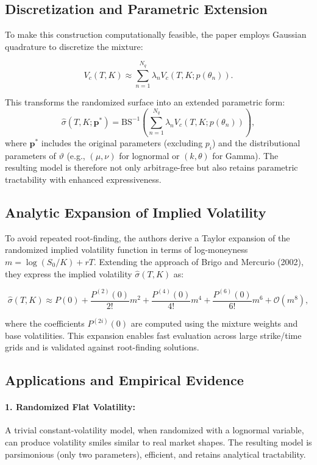 \subsection{Discretization and Parametric Extension}

To make this construction computationally feasible, the paper employs Gaussian quadrature to discretize the mixture:

\[
    V_c(T,K) \approx \sum_{n=1}^{N_q} \lambda_n V_c(T,K; p(\theta_n)).
\]

This transforms the randomized surface into an extended parametric form:
\[
    \hat{\sigma}(T,K; \mathbf{p}^*) = \text{BS}^{-1}\left(\sum_{n=1}^{N_q} \lambda_n V_c(T,K; p(\theta_n))\right),
\]
where $\mathbf{p}^*$ includes the original parameters (excluding $p_i$) and the distributional parameters of $\vartheta$ (e.g., $(\mu, \nu)$ for lognormal or $(k, \theta)$ for Gamma). The resulting model is therefore not only arbitrage-free but also retains parametric tractability with enhanced expressiveness.

\subsection{Analytic Expansion of Implied Volatility}

To avoid repeated root-finding, the authors derive a Taylor expansion of the randomized implied volatility function in terms of log-moneyness $m = \log(S_0/K) + rT$. Extending the approach of Brigo and Mercurio (2002), they express the implied volatility $\hat{\sigma}(T,K)$ as:

\[
    \hat{\sigma}(T,K) \approx P(0) + \frac{P^{(2)}(0)}{2!}m^2 + \frac{P^{(4)}(0)}{4!}m^4 + \frac{P^{(6)}(0)}{6!}m^6 + \mathcal{O}(m^8),
\]

where the coefficients $P^{(2i)}(0)$ are computed using the mixture weights and base volatilities. This expansion enables fast evaluation across large strike/time grids and is validated against root-finding solutions.

\subsection{Applications and Empirical Evidence}

\paragraph{1. Randomized Flat Volatility:}
A trivial constant-volatility model, when randomized with a lognormal variable, can produce volatility smiles similar to real market shapes. The resulting model is parsimonious (only two parameters), efficient, and retains analytical tractability.

